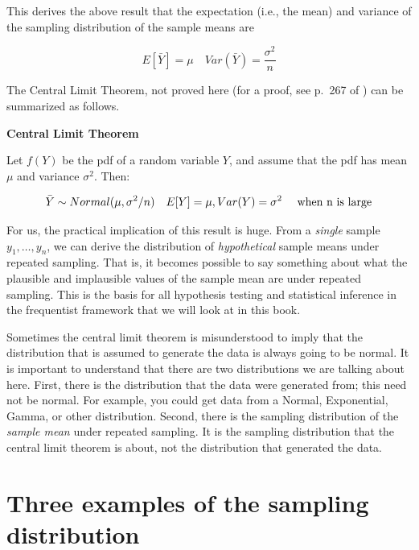 \documentclass[12pt,]{krantz}
\begin{document}
This derives the above result that the expectation (i.e., the mean) and variance of the sampling distribution of the sample means are

\begin{equation}
E[\bar{Y}] = \mu \quad Var(\bar{Y}) = \frac{\sigma^2}{n}
\end{equation}

The Central Limit Theorem, not proved here (for a proof, see p.~267 of \citet{millermiller}) can be summarized as follows.

\textbf{Central Limit Theorem}

Let \(f(Y)\) be the pdf of a random variable \(Y\), and assume that the pdf has mean \(\mu\) and variance \(\sigma^2\). Then:

\begin{equation}
\bar{Y} \sim Normal(\mu,\sigma^2/n) \quad  E[Y]=\mu,Var(Y)=\sigma^2 \quad \hbox{ when n is large}
\end{equation}

For us, the practical implication of this result is huge. From a \emph{single} sample \(y_1,\dots, y_n\), we can derive the distribution of \emph{hypothetical} sample means under repeated sampling. That is, it becomes possible to say something about what the plausible and implausible values of the sample mean are under repeated sampling. This is the basis for all hypothesis testing and statistical inference in the frequentist framework that we will look at in this book.

Sometimes the central limit theorem is misunderstood to imply that the distribution that is assumed to generate the data is always going to be normal. It is important to understand that there are two distributions we are talking about here. First, there is the distribution that the data were generated from; this need not be normal. For example, you could get data from a Normal, Exponential, Gamma, or other distribution. Second, there is the sampling distribution of the \emph{sample mean} under repeated sampling. It is the sampling distribution that the central limit theorem is about, not the distribution that generated the data.

\hypertarget{three-examples-of-the-sampling-distribution}{%
\section{Three examples of the sampling distribution}\label{three-examples-of-the-sampling-distribution}}
\end{document}
